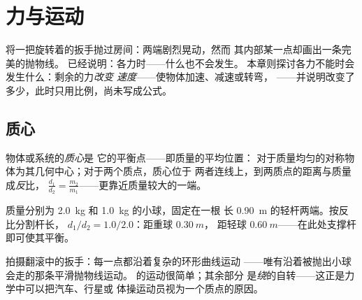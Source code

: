 \chapter{力与运动}\label{ch:g11:forces-and-motion}

将一把旋转着的扳手抛过房间：两端剧烈晃动，然而
其内部某一点却画出一条完美的抛物线。
已经说明：各力时——什么也不会发生。
本章则探讨各力不能时会发生什么：剩余的力\emph{改变
速度}——使物体加速、减速或转弯，
——并说明改变了多少，此时只用比例，尚未写成公式。

\section{质心}

\begin{definition}[质心]\label{def:g11:forces-and-motion:com}
物体或系统的\emph{质心}是
它的平衡点——即质量的平均位置：
对于质量均匀的对称物体为其几何中心；对于两个质点，质心位于
两者连线上，到两质点的距离与质量成\emph{反}比，
$\frac{d_1}{d_2} = \frac{m_2}{m_1}$——更靠近质量较大的一端。
\end{definition}

\begin{example}[不对称的哑铃]\label{ex:g11:forces-and-motion:dumbbell}
质量分别为 \qty{2.0}{kg} 和 \qty{1.0}{kg} 的小球，固定在一根
长 \qty{0.90}{m} 的轻杆两端。按反比分割杆长，
$d_1/d_2 = 1.0/2.0$：距重球 $\qty{0.30}{m}$，
距轻球 $\qty{0.60}{m}$——在此处支撑杆即可使其平衡。
\end{example}

\begin{remark}[抛出的扳手]\label{rem:g11:forces-and-motion:wrench}
拍摄翻滚中的扳手：每一点都沿着复杂的环形曲线运动
——唯有沿着被抛出小球会走的那条平滑抛物线运动。
的运动很简单；其余部分
是\emph{绕}的自转——这正是力学中可以把汽车、行星或
体操运动员视为一个质点的原因。
\end{remark}

